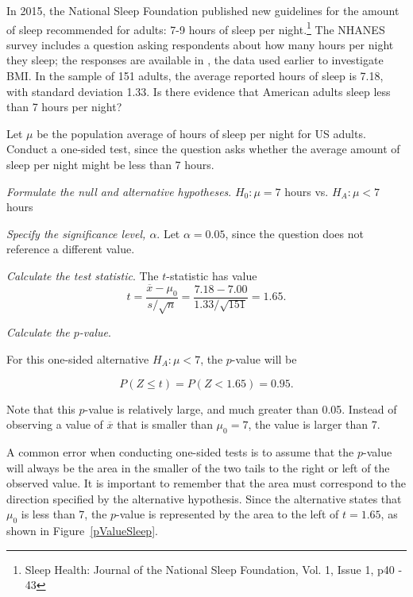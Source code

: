 \begin{spacing}{1.5}
\begin{example}
\end{example}

\newpage

\begin{example}
{In 2015, the National Sleep Foundation published new guidelines for the amount of sleep recommended for adults: 7-9 hours of sleep per night.\footnote{Sleep Health: Journal of the National Sleep Foundation, Vol. 1, Issue 1, p40 - 43} The NHANES survey includes a question asking respondents about how many hours per night they sleep; the responses are available in , the data used earlier to investigate BMI. In the sample of 151 adults, the average reported hours of sleep is 7.18, with standard deviation 1.33. Is there evidence that American adults sleep less than 7 hours per night?}

Let $\mu$ be the population average of hours of sleep per night for US adults. Conduct a one-sided test, since the question asks whether the average amount of sleep per night might be less than 7 hours. 

\textit{Formulate the null and alternative hypotheses}. $H_0: \mu = 7$ hours vs. $H_A: \mu < 7$ hours

\textit{Specify the significance level, $\alpha$}.  Let $\alpha = 0.05$, since the question does not reference a different value. 

\textit{Calculate the test statistic}. The $t$-statistic has value
\[t = \frac{\overline{x}-\mu_0}{s/\sqrt{n}} = \frac{7.18 - 7.00} {1.33/\sqrt{151}} = 1.65.\]

\textit{Calculate the $p$-value}.

For this one-sided alternative $H_A: \mu < 7$, the $p$-value will be 

\[P(Z \leq t) = P(Z < 1.65) = 0.95.\]

Note that this $p$-value is relatively large, and much greater than 0.05. Instead of observing a value of $\overline{x}$ that is smaller than $\mu_0 = 7$, the value is larger than 7. 

A common error when conducting one-sided tests is to assume that the $p$-value will always be the area in the smaller of the two tails to the right or left of the observed value. It is important to remember that the area must correspond to the direction specified by the alternative hypothesis. Since the alternative states that $\mu_0$ is less than 7, the $p$-value is represented by the area to the left of $t = 1.65$, as shown in Figure~\ref{pValueSleep}.


\end{example}
\end{spacing}
